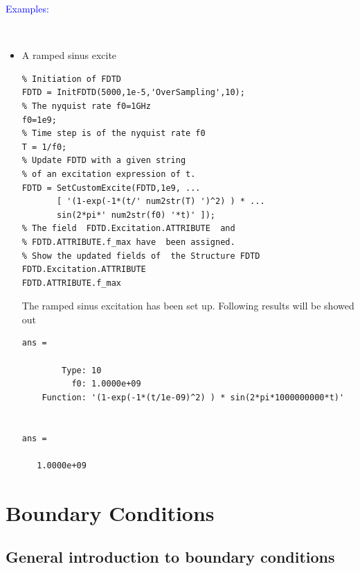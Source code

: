 	    \textcolor{blue}{\begin{large}Examples:\end{large}}\\
    \begin{itemize}
	\item A ramped sinus excite 
	\begin{lstlisting}
% Initiation of FDTD 
FDTD = InitFDTD(5000,1e-5,'OverSampling',10);
% The nyquist rate f0=1GHz
f0=1e9;
% Time step is of the nyquist rate f0
T = 1/f0;
% Update FDTD with a given string 
% of an excitation expression of t. 
FDTD = SetCustomExcite(FDTD,1e9, ...
       [ '(1-exp(-1*(t/' num2str(T) ')^2) ) * ...
       sin(2*pi*' num2str(f0) '*t)' ]);
% The field  FDTD.Excitation.ATTRIBUTE  and
% FDTD.ATTRIBUTE.f_max have  been assigned.
% Show the updated fields of  the Structure FDTD
FDTD.Excitation.ATTRIBUTE
FDTD.ATTRIBUTE.f_max
	\end{lstlisting}
	The ramped sinus excitation has been set up.  Following results will be showed out
	\begin{lstlisting}
ans = 

        Type: 10
          f0: 1.0000e+09
    Function: '(1-exp(-1*(t/1e-09)^2) ) * sin(2*pi*1000000000*t)'


ans =

   1.0000e+09
	\end{lstlisting}
    \end{itemize}

\section{Boundary Conditions}\label{sec:BC}
    \subsection{General introduction to boundary conditions}\label{subsec:General introduction to BC}
